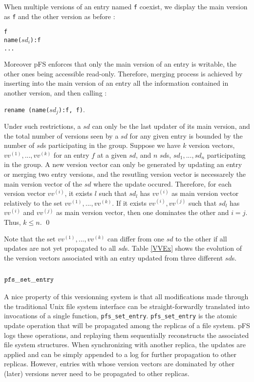 When multiple versions of an entry named {\tt f} coexist, we display
the main version as {\tt f} and the other version as before :
\begin{center}
  {\tt f} \\
  {\tt name($sd_{i}$):f} \\
  {\tt ...}
\end{center}
Moreover pFS enforces that only the main version of an entry is
writable, the other ones being accessible read-only.
Therefore, merging process is achieved by inserting into the main
version of an entry all the information contained in another version,
and then calling :
\begin{center}
{\tt rename (name($sd_{j}$):f, f)}.
\end{center}
Under such restrictions, a $sd$ can only be the last updater of its
main version, and the total number of versions seen by a $sd$ for any
given entry is bounded by the number of $sd$s participating in the group.
{\proof
Suppose we have $k$ version vectors, $vv^{(1)},..., vv^{(k)}$ for an
entry $f$ at a given $sd$, and $n$ $sd$s, $sd_{1}, ..., sd_{n}$
participating in the group. A new version vector can only be generated
by updating an entry or merging two entry versions, and the resutling
version vector is necessarely the main version vector of the $sd$
where the update occured. Therefore, for each version vector
$vv^{(i)}$, it exists $l$ such that $sd_{l}$ has $vv^{(i)}$ as main
version vector relatively to the set $vv^{(1)},..., vv^{(k)}$. If it
exists $vv^{(i)},vv^{(j)}$ such that $sd_{l}$ has $vv^{(i)}$ and
$vv^{(j)}$ as main version vector, then one dominates the other and
$i=j$. Thus, $k \leq n$. \qed
}

Note that the set $vv^{(1)},..., vv^{(k)}$ can differ from one $sd$ to
the other if all updates are not yet propagated to all $sd$s. Table \ref{VVEx}
shows the evolution of the version vectors associated with an
entry updated from three different $sd$s.

\subsection {${\tt pfs\_set\_entry}$}
\label{sec:pfssetentry}

A nice property of this versionning system is that all modifications
made through the traditional Unix file system interface can be
straight-forwardly translated into invocations of a single function,
{\tt pfs\_set\_entry}.  {\tt pfs\_set\_entry} is the atomic update
operation that will be propagated among the replicas of a file system.
pFS logs these operations, and replaying them sequentially
reconstructs the associated file system structures.  When
synchronizing with another replica, the updates are applied and can be
simply appended to a log for further propagation to other replicas.
However, entries with whose version vectors are dominated by other
(later) versions never need to be propagated to other replicas.

